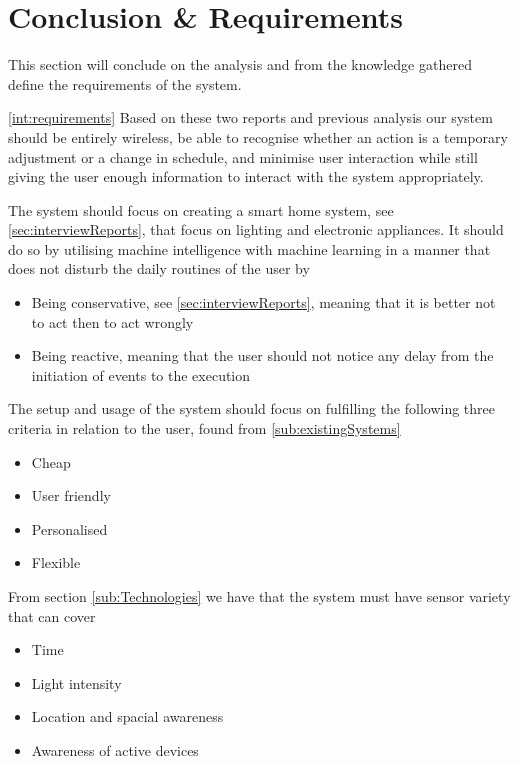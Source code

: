 \section{Conclusion \& Requirements}\label{sec:requirements}
This section will conclude on the analysis and from the knowledge gathered define the requirements of the system.

\cref{int:requirements} Based on these two reports and previous analysis our system should be entirely wireless, be able to recognise whether an action is a temporary adjustment or a change in schedule, and minimise user interaction while still giving the user enough information to interact with the system appropriately.

The system should focus on creating a smart home system, see \cref{sec:interviewReports}, that focus on lighting and electronic appliances. It should do so by utilising machine intelligence with machine learning in a manner that does not disturb the daily routines of the user by
\begin{itemize}
  \item Being conservative, see \cref{sec:interviewReports}, meaning that it is better not to act then to act wrongly
  \item Being reactive, meaning that the user should not notice any delay from the initiation of events to the execution
\end{itemize}

The setup and usage of the system should focus on fulfilling the following three criteria in relation to the user, found from \cref{sub:existingSystems}
\begin{itemize}
  \item Cheap
  \item User friendly
  \item Personalised
  \item Flexible
\end{itemize}

From section \cref{sub:Technologies} we have that the system must have sensor variety that can cover
\begin{itemize}
  \item Time
  \item Light intensity
  \item Location and spacial awareness
  \item Awareness of active devices
\end{itemize}

